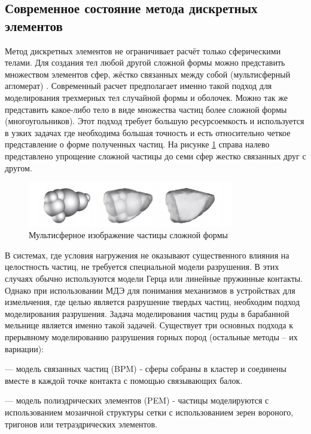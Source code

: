 \documentclass[utf8x, 14pt, oneside, a4paper]{article}
\begin{document}
\subsection*{Современное состояние метода дискретных элементов}

Метод дискретных элементов не ограничивает расчёт только сферическими телами. 
Для создания тел любой другой сложной формы можно представить множеством элементов сфер, жёстко связанных между собой (мультисферный агломерат) \cite{aglomerath}.
Современный расчет предполагает именно такой подход для моделирования трехмерных тел случайной формы и оболочек.
Можно так же представить какое-либо тело в виде множества частиц более сложной формы (многоугольников). 
Этот подход требует большую ресурсоемкость и используется в узких задачах где необходима большая точность и есть относительно четкое представление о форме полученных частиц.
На рисунке \ref{pic:aglomerath} справа налево представлено упрощение сложной частицы до семи сфер жестко связанных друг с другом.
\begin{figure}[H]
	\centering
	\includegraphics[width=0.8\textwidth]{aglomerath}
	\caption{Мультисферное изображение частицы сложной формы \cite{another_hard}}
	\label{pic:aglomerath}
\end{figure} 

В системах, где условия нагружения не оказывают существенного влияния на целостность частиц, не требуется специальной модели разрушения. 
В этих случаях обычно используются модели Герца или линейные пружинные контакты. 
Однако при использовании МДЭ для понимания механизмов в устройствах для измельчения, где целью является разрушение твердых частиц, необходим подход моделирования разрушения.
Задача моделирования частиц руды в барабанной мельнице является именно такой задачей.
Существует три основных подхода \cite{another_hard} к прерывному моделированию разрушения горных пород (остальные методы -- их вариации):

--- модель связанных частиц (BPM) - сферы собраны в кластер и соединены вместе в каждой точке контакта с помощью связывающих балок.
 
--- модель полиэдрических элементов (PEM) - частицы моделируются с использованием мозаичной структуры сетки с использованием зерен вороного, тригонов или тетраэдрических элементов.
 
\end{document}
